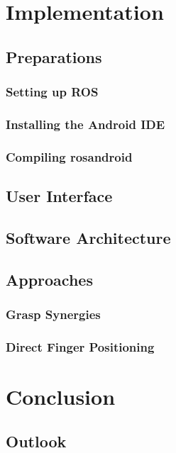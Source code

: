 \documentclass[11pt,DIV=15,BCOR=20mm,bibliography=totoc]{scrbook}
\begin{document}


\frontmatter

\tableofcontents
\cleardoublepage

\mainmatter





\chapter{Implementation}
\section{Preparations}
\subsection{Setting up ROS}
\subsection{Installing the Android IDE}
\subsection{Compiling rosandroid}

\section{User Interface}

\section{Software Architecture}

\section{Approaches}

\subsection{Grasp Synergies}

\subsection{Direct Finger Positioning}

\chapter{Conclusion}

\section{Outlook}

\cleardoublepage


\begin{otherlanguage}{german}
	\printbibliography
\end{otherlanguage}

\cleardoublepage


    
\end{document}
